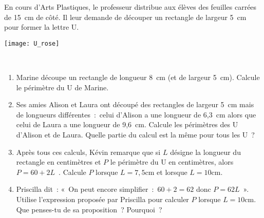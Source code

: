 \begin{exercice}
 \begin{minipage}[c]{0.58\linewidth}
 En cours d'Arts Plastiques, le professeur distribue aux élèves des feuilles carrées de 15 cm de côté. Il leur demande de découper un rectangle de largeur 5 cm pour former la lettre U. 
  \end{minipage} \hfill%
  \begin{minipage}[c]{0.38\linewidth}
  \texttt{[image: U\_rose]}
  \end{minipage} \\
\begin{enumerate}
 \item Marine découpe un rectangle de longueur 8 cm (et de largeur 5 cm). Calcule le périmètre du U de Marine.
 \item Ses amies Alison et Laura ont découpé des rectangles de largeur 5 cm mais de longueurs différentes : celui d'Alison a une longueur de 6,3 cm alors que celui de Laura a une longueur de 9,6 cm. Calcule les périmètres des U d'Alison et de Laura. Quelle partie du calcul est la même pour tous les U ? 
 \item Après tous ces calculs, Kévin remarque que si $L$ désigne la longueur du rectangle en centimètres et $P$ le périmètre du U en centimètres, alors $P = 60 + 2L$ . Calcule $P$ lorsque $L = 7,5 \text{cm}$ et lorsque $L = 10 \text{cm}$.
 \item Priscilla dit : « On peut encore simplifier : $60 + 2 = 62$ donc $P = 62 L$ ». Utilise l'expression proposée par Priscilla pour calculer $P$ lorsque $L = 10 \text{cm}$. Que penses-tu de sa proposition ? Pourquoi ?
 \end{enumerate}
\end{exercice}


